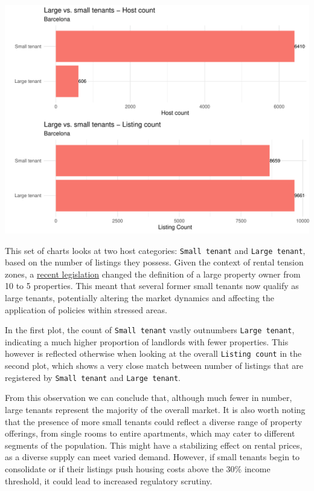 \documentclass[
]{article}
\begin{document}
\begin{center}\includegraphics{Barcelona-AirBnB-Insights_files/figure-latex/plot7-1} \end{center}

This set of charts looks at two host categories: \texttt{Small\ tenant}
and \texttt{Large\ tenant}, based on the number of listings they
possess. Given the context of rental tension zones, a
\href{https://www.boe.es/buscar/act.php?id=BOE-A-2023-12203}{recent
legislation} changed the definition of a large property owner from 10 to
5 properties. This meant that several former small tenants now qualify
as large tenants, potentially altering the market dynamics and affecting
the application of policies within stressed areas.

In the first plot, the count of \texttt{Small\ tenant} vastly outnumbers
\texttt{Large\ tenant}, indicating a much higher proportion of landlords
with fewer properties. This however is reflected otherwise when looking
at the overall \texttt{Listing\ count} in the second plot, which shows a
very close match between number of listings that are registered by
\texttt{Small\ tenant} and \texttt{Large\ tenant}.

From this observation we can conclude that, although much fewer in
number, large tenants represent the majority of the overall market. It
is also worth noting that the presence of more small tenants could
reflect a diverse range of property offerings, from single rooms to
entire apartments, which may cater to different segments of the
population. This might have a stabilizing effect on rental prices, as a
diverse supply can meet varied demand. However, if small tenants begin
to consolidate or if their listings push housing costs above the 30\%
income threshold, it could lead to increased regulatory scrutiny.
\end{document}
